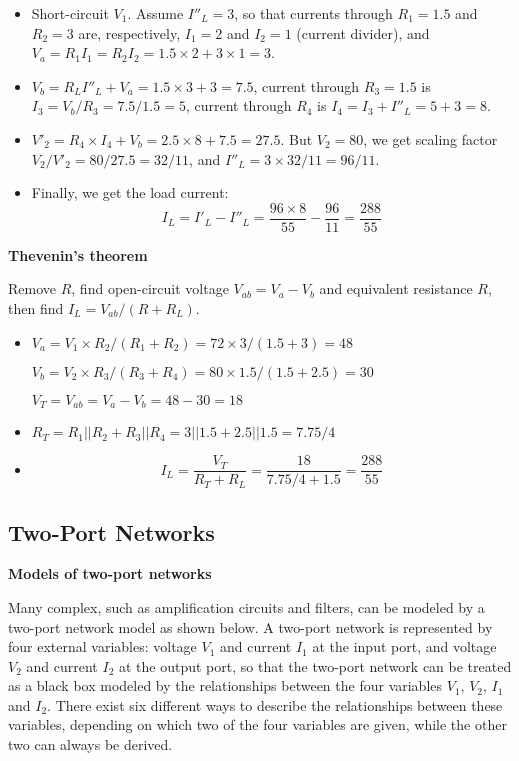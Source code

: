 \begin{itemize}
\begin{itemize}
\item Short-circuit $V_1$. Assume $I''_L=3$, so that currents through
	$R_1=1.5$ and $R_2=3$ are, respectively, $I_1=2$ and $I_2=1$
	(current divider), and $V_a=R_1I_1=R_2I_2=1.5\times 2+3\times 1=3$.
\item $V_b=R_L I''_L+V_a=1.5\times 3+3=7.5$, current through $R_3=1.5$
	is $I_3=V_b/R_3=7.5/1.5=5$, current through $R_4$ is 
	$I_4=I_3+I''_L=5+3=8$.
\item $V'_2=R_4\times I_4+V_b=2.5\times 8+7.5=27.5$. But $V_2=80$,
	we get scaling factor $V_2/V'_2=80/27.5=32/11$, and 
	$I''_L=3\times 32/11=96/11$.

\item Finally, we get the load current:
\[	I_L=I'_L-I''_L=\frac{96\times 8}{55}-\frac{96}{11}=\frac{288}{55} \]

\end{itemize}

{\bf Thevenin's theorem}

Remove $R$, find open-circuit voltage $V_{ab}=V_a-V_b$ and equivalent
resistance $R$, then find $I_L=V_{ab}/(R+R_L)$.

\begin{itemize}
\item 
  $V_a=V_1\times R_2/(R_1+R_2)=72\times 3/(1.5+3)=48$

  $V_b=V_2\times R_3/(R_3+R_4)=80\times 1.5/(1.5+2.5)=30$

  $V_T=V_{ab}=V_a-V_b=48-30=18$
\item 
  $R_T=R_1 || R_2 + R_3 || R_4=3||1.5+2.5||1.5=7.75/4$
\item 
  \[ 
  I_L=\frac{V_T}{R_T+R_L}=\frac{18}{7.75/4+1.5}=\frac{288}{55} 
  \]
\end{itemize}

\subsection*{Two-Port Networks}

{\bf Models of two-port networks}

Many complex, such as amplification circuits and filters, can be modeled
by a two-port network model as shown below. A two-port network is 
represented by four external variables: voltage $V_1$ and current $I_1$ 
at the input port, and voltage $V_2$ and current $I_2$ at the output port, 
so that the two-port network can be treated as a black box modeled by the
relationships between the four variables $V_1$, $V_2$, $I_1$ and $I_2$.
There exist six different ways to describe the relationships between these 
variables, depending on which two of the four variables are given, while 
the other two can always be derived. 


\end{itemize}
